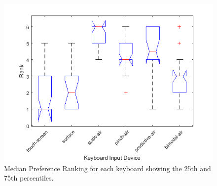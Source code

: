 \begin{figure}[t]
	\centering
	\includegraphics{Figures/fig_ranking_boxplot}
	\caption[Preference Ranking Boxplot]{Median Preference Ranking for each keyboard showing the 25th and 75th percentiles.}
	\label{fig_ranking_boxplot}
\end{figure}

